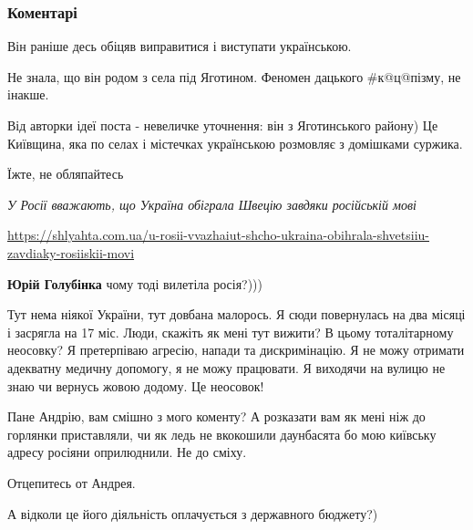  
 
 
 
 
\subsubsection{Коментарі}

\begin{itemize}
Він раніше десь обіцяв виправитися і виступати українською.

Не знала, що він родом з села під Яготином. Феномен дацького #к@ц@пізму, не інакше.

Від авторки ідеї поста - невеличке уточнення: він з Яготинського району) Це Київщина, яка по селах і містечках українською розмовляє з домішками суржика.

Їжте, не обляпайтесь\par
{\em У Росії вважають, що Україна обіграла Швецію завдяки російській мові}\par
\url{https://shlyahta.com.ua/u-rosii-vvazhaiut-shcho-ukraina-obihrala-shvetsiiu-zavdiaky-rosiiskii-movi}

\textbf{Юрій Голубінка} чому тоді вилетіла росія?)))


Тут нема ніякої України, тут довбана малорось. Я сюди повернулась на два місяці
і засрягла на 17 міс. Люди, скажіть як мені тут вижити? В цьому тоталітарному
неосовку? Я претерпіваю агресію, напади та дискримінацію. Я не можу отримати
адекватну медичну допомогу, я не можу працювати. Я виходячи на вулицю не знаю
чи вернусь жовою додому. Це неосовок!


Пане Андрію, вам смішно з мого коменту? А розказати вам як мені ніж до горлянки
приставляли, чи як ледь не вкокошили даунбасята бо мою київську адресу росіяни
оприлюднили. Не до сміху.

Отцепитесь от Андрея.

А відколи це його діяльність оплачується з державного бюджету?)


\end{itemize}
